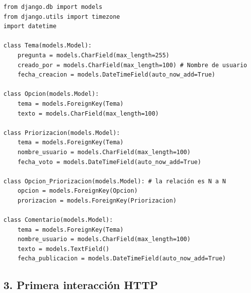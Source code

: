 \begin{verbatim}
from django.db import models
from django.utils import timezone
import datetime

class Tema(models.Model):
    pregunta = models.CharField(max_length=255)
    creado_por = models.CharField(max_length=100) # Nombre de usuario
    fecha_creacion = models.DateTimeField(auto_now_add=True)

class Opcion(models.Model):
    tema = models.ForeignKey(Tema)
    texto = models.CharField(max_length=100)

class Priorizacion(models.Model):
    tema = models.ForeignKey(Tema)
    nombre_usuario = models.CharField(max_length=100)
    fecha_voto = models.DateTimeField(auto_now_add=True)
    
class Opcion_Priorizacion(models.Model): # la relación es N a N
    opcion = models.ForeignKey(Opcion)
    prorizacion = models.ForeignKey(Priorizacion)

class Comentario(models.Model):
    tema = models.ForeignKey(Tema)
    nombre_usuario = models.CharField(max_length=100)
    texto = models.TextField()
    fecha_publicacion = models.DateTimeField(auto_now_add=True)
\end{verbatim}

\subsection*{3. Primera interacción HTTP}

